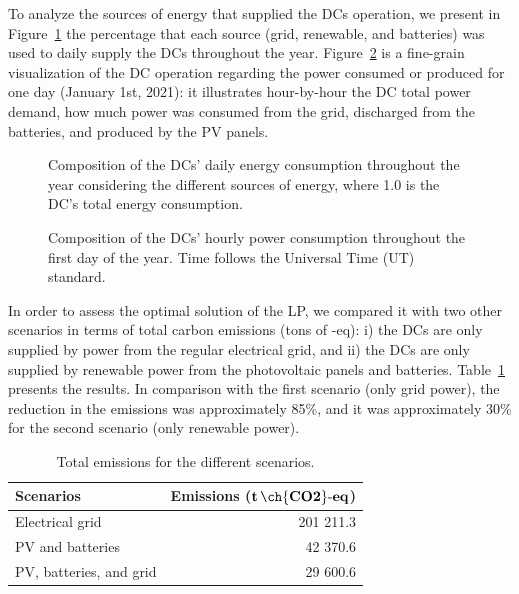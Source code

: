 To analyze the sources of energy that supplied the DCs operation, we present in Figure~\ref{fig:energy_ratio_daily} the percentage that each source (grid, renewable, and batteries) was used to daily supply the DCs throughout the year. Figure~\ref{fig:power_ratio_hourly} is a fine-grain visualization of the DC operation regarding the power consumed or produced for one day (January 1st, 2021): it illustrates hour-by-hour the DC total power demand, how much power was consumed from the grid, discharged from the batteries, and produced by the PV panels.
 

\begin{figure}[h]
  \centering
   {}
  \caption{Composition of the DCs' daily energy consumption throughout the year considering the different sources of energy, where 1.0 is the DC's total energy consumption.}
  \label{fig:energy_ratio_daily}
\end{figure}




 \begin{figure}[h]
  \centering
   {}
  \caption{Composition of the DCs' hourly power consumption throughout the first day of the year. Time follows the Universal Time (UT) standard.}
  \label{fig:power_ratio_hourly}
\end{figure}

In order to assess the optimal solution of the LP, we compared it with two other scenarios in terms of total carbon emissions (tons of -eq): i) the DCs are only supplied by power from the regular electrical grid, and ii) the DCs are only supplied by renewable power from the photovoltaic panels and batteries. Table~\ref{tab:emissions} presents the results. In comparison with the first scenario (only grid power), the reduction in the  emissions was approximately 85\%, and it was approximately 30\% for the second scenario (only renewable power).


\begin{table}[h]
\caption{Total emissions for the different scenarios.}\label{tab:emissions} \centering
\begin{tabular}{|p{5cm}|r|}
  \hline
  \textbf{Scenarios} & \textbf{Emissions ($\mathbf{t\,\ch{CO2}\text{-}eq}$)}   \\
  \hline
  Electrical grid                    & 201 211.3    \\
  \hline
  PV and batteries  &                  42 370.6 \\ 
  \hline
  PV, batteries, and grid            &  29 600.6   \\
  \hline


\end{tabular}
\end{table}

